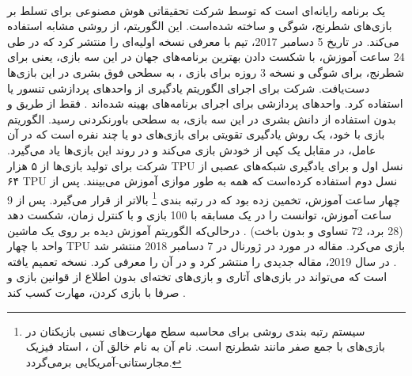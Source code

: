   

\paragraph{}
یک برنامه رایانه‌ای است که توسط شرکت تحقیقاتی هوش مصنوعی
 برای تسلط بر بازی‌های شطرنج، شوگی و 
ساخته شده‌است. این الگوریتم، از روشی مشابه
  استفاده می‌کند. در تاریخ 5 دسامبر 2017،  تیم
  با معرفی
   نسخه اولیه‌ای را منتشر کرد که در طی 24 ساعت آموزش، با شکست دادن بهترین برنامه‌های جهان در این سه بازی، یعنی
    برای شطرنج،
برای شوگی و نسخه 3 روزه
برای بازی 
،
به سطحی فوق بشری در این بازی‌ها دست‌یافت.  شرکت 
برای اجرای الگوریتم یادگیری
از واحدهای پردازشی تنسور 
یا 
استفاده کرد. واحدهای پردازشی  برای اجرای برنامه‌های
بهینه شده‌اند
\cite{silver2017}.
  فقط از طریق 
و بدون استفاده از دانش بشری در این سه بازی، به سطحی باورنکردنی رسید. الگوریتم بازی با خود، یک روش یادگیری تقویتی برای بازی‌های دو یا چند نفره است که در آن عامل، در مقابل یک کپی از خودش بازی می‌کند و در روند این بازی‌ها یاد می‌گیرد.
شرکت
  برای تولید  بازی‌ها از ۵ هزار TPU نسل اول و برای یادگیری شبکه‌های عصبی از ۶۴ TPU نسل دوم استفاده کرده‌است که همه به طور موازی آموزش می‌بینند.
پس از چهار ساعت آموزش،
  تخمین زده بود که
    در رتبه بندی
\footnote{سیستم رتبه بندی
	  روشی برای محاسبه سطح مهارت‌های نسبی بازیکنان در بازی‌های با جمع صفر مانند شطرنج است. نام آن به نام خالق آن
،
استاد فیزیک مجارستانی-آمریکایی برمی‌گردد.}
بالاتر از
  قرار می‌گیرد. پس از 9 ساعت آموزش، توانست
را در یک مسابقه با 100 بازی و با کنترل زمان، شکست دهد (28 برد، 72 تساوی و بدون باخت) 
\cite{silver2017, knapton2017entire, superhuman2017}.
درحالی‌که الگوریتم آموزش دیده 
بر روی یک ماشین واحد با چهار TPU بازی می‌کرد.
مقاله
  در مورد
    در ژورنال
در 7 دسامبر 2018 منتشر شد
\cite{silver2018general}.
در سال 2019،
مقاله جدیدی را منتشر کرد و در آن
را معرفی کرد. 
نسخه تعمیم یافته 
است که می‌تواند در بازی‌های آتاری و بازی‌های تخته‌ای 
 بدون اطلاع از قوانین بازی و صرفا با بازی کردن، مهارت کسب کند
 \cite{alphazerowiki}.



